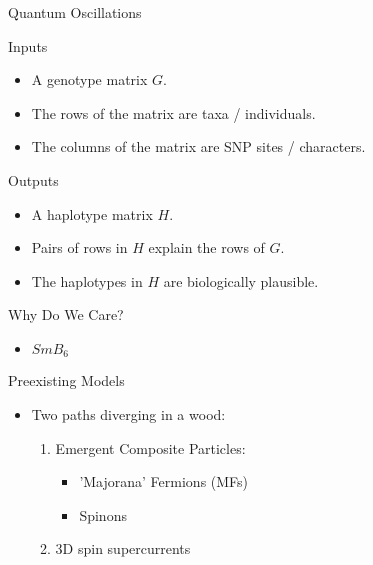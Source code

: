 \documentclass{beamer}
\begin{document}
\begin{frame}[t]{Quantum Oscillations}
  \begin{block}{Inputs}
    \begin{itemize}
    \item A \alert{genotype matrix} $G$.
    \item The \alert{rows} of the matrix are \alert{taxa / individuals}.
    \item The \alert{columns} of the matrix are \alert{SNP sites /
        characters}. 
    \end{itemize}
  \end{block}
  \begin{block}{Outputs}
    \begin{itemize}
    \item A \alert{haplotype matrix} $H$.
    \item Pairs of rows in $H$ \alert{explain} the rows of $G$.
    \item The haplotypes in $H$ are \alert{biologically plausible}. 
    \end{itemize}
  \end{block}
\end{frame}




\begin{frame}{Why Do We Care?}
  \begin{itemize}
      \item $SmB_6$
  \end{itemize}
\end{frame}




\begin{frame}{Preexisting Models}


    \begin{itemize}
        \item Two paths diverging in a wood:
            \begin{enumerate}
                \item Emergent Composite Particles:
                    \begin{itemize}
                        \item 'Majorana' Fermions (MFs)
                        \item Spinons
                    \end{itemize}
        
                \item 3D spin supercurrents
        \end{enumerate}
    \end{itemize}
    

\end{frame}
\end{document}
